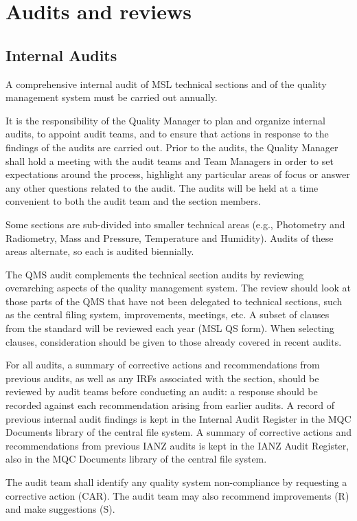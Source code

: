 \section{Audits and reviews}
\subsection{Internal Audits}
\label{ss:internal_audit}
A comprehensive internal audit of MSL technical sections and of the quality management system must be carried out annually. 

It is the responsibility of the Quality Manager to plan and organize internal audits, to appoint audit teams, and to ensure that actions in response to the findings of the audits are carried out. Prior to the audits, the Quality Manager shall hold a meeting with the audit teams and Team Managers in order to set expectations around the process, highlight any particular areas of focus or answer any other questions related to the audit. The audits will be held at a time convenient to both the audit team and the section members. 

Some sections are sub-divided into smaller technical areas (e.g., Photometry and Radiometry, Mass and Pressure, Temperature and Humidity). Audits of these areas alternate, so each is audited biennially.

The QMS audit complements the technical section audits by reviewing overarching aspects of the quality management system. The review should look at those parts of the QMS that have not been delegated to technical sections, such as the central filing system, improvements, meetings, etc. A subset of clauses from the standard will be reviewed each year (MSL QS form). When selecting clauses, consideration should be given to those already covered in recent audits. 

For all audits, a summary of corrective actions and recommendations from previous audits, as well as any IRFs associated with the section, should be reviewed by audit teams before conducting an audit: a response should be recorded against each recommendation arising from earlier audits. A record of previous internal audit findings is kept in the Internal Audit Register in the MQC Documents library of the central file system. A summary of corrective actions and recommendations from previous IANZ audits is kept in the IANZ Audit Register, also in the MQC Documents library of the central file system. 

The audit team shall identify any quality system non-compliance by requesting a corrective action (CAR). The audit team may also recommend improvements (R) and make suggestions (S). 

